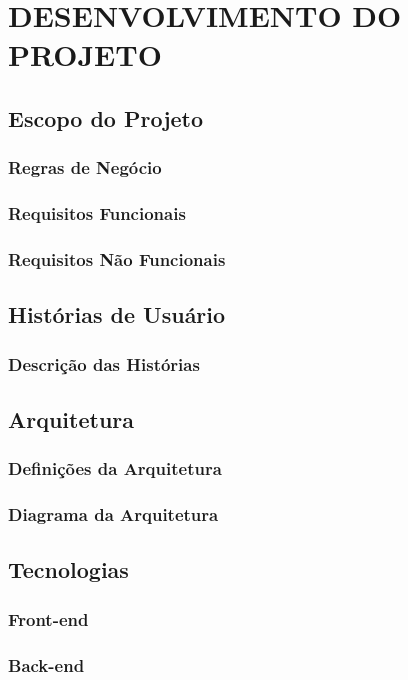 \chapter{DESENVOLVIMENTO DO PROJETO}
\section{Escopo do Projeto}
\subsection{Regras de Negócio}
\subsection{Requisitos Funcionais}
\subsection{Requisitos Não Funcionais}

\section{Histórias de Usuário}
\subsection{Descrição das Histórias}

\section{Arquitetura}
\subsection{Definições da Arquitetura}
\subsection{Diagrama da Arquitetura}

\section{Tecnologias}
\subsection{Front-end}
\subsection{Back-end}
